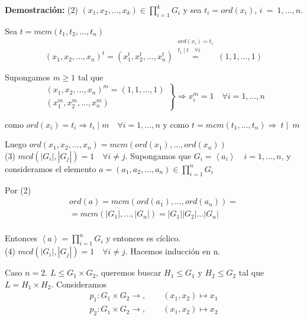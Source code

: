 \documentclass{article}
\begin{document}
\textbf{Demostración:} (2) $(x_1,x_2,\ldots,x_k)\in \prod_{i=1}^k G_i$ y sea $t_i=ord(x_i)$, $i~=~1,\ldots,n$.

Sea $t=mcm(t_1,t_2,\ldots,t_n)$
\begin{equation*}
(x_1,x_2,\ldots,x_n)^t=(x_1^t,x_2^t,\ldots,x_n^t)\overset{\left.\begin{array}{c}
ord(x_i)=t_i \\
t_i\mid t \quad \forall i
\end{array} \right.}{=} (1,1,\ldots,1)
\end{equation*}

Supongamos $m\geq 1$ tal que
\begin{equation*}
\left. \begin{array}{c}
(x_1,x_2,\ldots,x_n)^m=(1,1,\ldots,1)\\
(x_1^m,x_2^m,\ldots,x_n^m)
\end{array} \right\rbrace \Rightarrow x_i^m=1 \quad \forall i=1,\ldots,n
\end{equation*}

como $ord(x_i)=t_i\Rightarrow t_i\mid m \quad \forall i=1,\ldots,n$ y como $t=mcm(t_1,\ldots,t_n)\Rightarrow~t\mid~m$

Luego $ord(x_1,x_2,\ldots,x_n)=mcm(ord(x_1),\ldots,ord(x_n))$ \\

(3) $mcd(|G_i|,|G_j|)=1\quad \forall i\neq j$. Supongamos que $G_i=\left\langle a_i\right\rangle \quad i=1,\ldots,n$, y consideramos el elemento $a=(a_1,a_2,\ldots,a_n)\in \prod_{i=1}^n G_i$

Por (2)
\begin{gather*}
ord(a)=mcm(ord(a_1),\ldots,ord(a_n))= \\
=mcm(|G_1|,\ldots,|G_n|)=|G_1||G_2|\ldots|G_n| \\
\end{gather*}

Entonces $\left\langle a \right\rangle = \prod_{i=1}^nG_i$ y entonces es cíclico. \\

(4) $mcd(|G_i|,|G_j|)=1\quad \forall i\neq j$. Hacemos inducción en n.

Caso $n=2$. $L\leq G_1\times G_2$, queremos buscar $H_1\leq G_1$ y $H_2\leq G_2$ tal que $L=H_1\times H_2$. Consideramos
\begin{gather*}
p_1:G_1\times G_2\longrightarrow,\qquad (x_1,x_2)\longmapsto x_1 \\
p_2:G_1\times G_2\longrightarrow,\qquad (x_1,x_2)\longmapsto x_2
\end{gather*}
\end{document}
